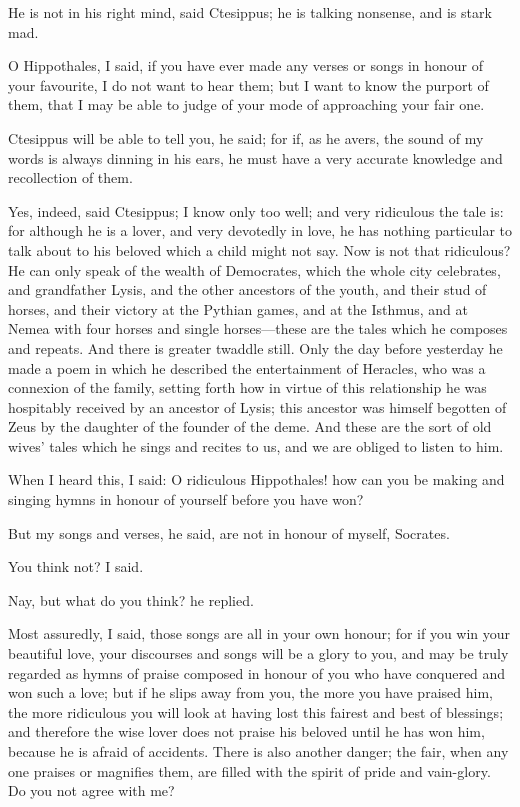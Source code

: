 \documentclass[11pt,letter]{article}
\begin{document}
\par  He is not in his right mind, said Ctesippus; he is talking nonsense, and is stark mad.

\par  O Hippothales, I said, if you have ever made any verses or songs in honour of your favourite, I do not want to hear them; but I want to know the purport of them, that I may be able to judge of your mode of approaching your fair one.

\par  Ctesippus will be able to tell you, he said; for if, as he avers, the sound of my words is always dinning in his ears, he must have a very accurate knowledge and recollection of them.

\par  Yes, indeed, said Ctesippus; I know only too well; and very ridiculous the tale is: for although he is a lover, and very devotedly in love, he has nothing particular to talk about to his beloved which a child might not say. Now is not that ridiculous? He can only speak of the wealth of Democrates, which the whole city celebrates, and grandfather Lysis, and the other ancestors of the youth, and their stud of horses, and their victory at the Pythian games, and at the Isthmus, and at Nemea with four horses and single horses—these are the tales which he composes and repeats. And there is greater twaddle still. Only the day before yesterday he made a poem in which he described the entertainment of Heracles, who was a connexion of the family, setting forth how in virtue of this relationship he was hospitably received by an ancestor of Lysis; this ancestor was himself begotten of Zeus by the daughter of the founder of the deme. And these are the sort of old wives' tales which he sings and recites to us, and we are obliged to listen to him.

\par  When I heard this, I said: O ridiculous Hippothales! how can you be making and singing hymns in honour of yourself before you have won?

\par  But my songs and verses, he said, are not in honour of myself, Socrates.

\par  You think not? I said.

\par  Nay, but what do you think? he replied.

\par  Most assuredly, I said, those songs are all in your own honour; for if you win your beautiful love, your discourses and songs will be a glory to you, and may be truly regarded as hymns of praise composed in honour of you who have conquered and won such a love; but if he slips away from you, the more you have praised him, the more ridiculous you will look at having lost this fairest and best of blessings; and therefore the wise lover does not praise his beloved until he has won him, because he is afraid of accidents. There is also another danger; the fair, when any one praises or magnifies them, are filled with the spirit of pride and vain-glory. Do you not agree with me?
\end{document}
